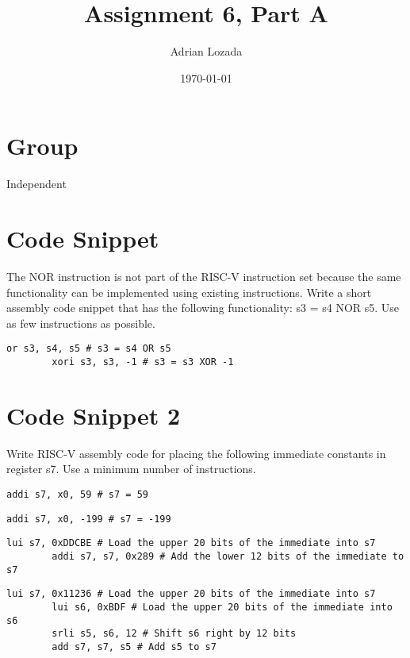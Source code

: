 \documentclass[12pt]{article}
\title{Assignment 6, Part A}
\author{Adrian Lozada}
\date{\today}
\begin{document}
\maketitle
\newpage

    \section{Group}
    Independent

\section{Code Snippet}
    \begin{flushleft}
        The NOR instruction is not part of the RISC-V instruction set because the same 
        functionality can be implemented using existing instructions. Write a short assembly code 
        snippet that has the following functionality: s3 = s4 NOR s5. Use as few instructions as 
        possible.
    \end{flushleft}
    \begin{lstlisting}[language=RISCV]
        or s3, s4, s5 # s3 = s4 OR s5 
        xori s3, s3, -1 # s3 = s3 XOR -1
    \end{lstlisting}
    
    \section{Code Snippet 2}
    \begin{flushleft}
        Write RISC-V assembly code for placing the following immediate constants in register s7.
        Use a minimum number of instructions.
    \end{flushleft}
    \begin{lstlisting}[language=RISCV]
        addi s7, x0, 59 # s7 = 59
    \end{lstlisting}
    \begin{lstlisting}[language=RISCV]
        addi s7, x0, -199 # s7 = -199
    \end{lstlisting}
    \begin{lstlisting}[language=RISCV]
        lui s7, 0xDDCBE # Load the upper 20 bits of the immediate into s7
        addi s7, s7, 0x289 # Add the lower 12 bits of the immediate to s7
    \end{lstlisting}
    \begin{lstlisting}[language=RISCV]
        lui s7, 0x11236 # Load the upper 20 bits of the immediate into s7
        lui s6, 0xBDF # Load the upper 20 bits of the immediate into s6
        srli s5, s6, 12 # Shift s6 right by 12 bits
        add s7, s7, s5 # Add s5 to s7
    \end{lstlisting}
\end{document}
